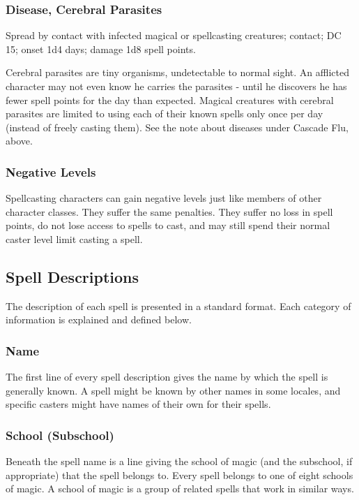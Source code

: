 \documentclass[../VancianToPsionics.tex]{subfiles}
\begin{document}
\subsubsection{Disease, Cerebral Parasites}
Spread by contact with infected magical or spellcasting creatures; contact; DC 15; onset 1d4 days; damage 1d8 spell points. 

Cerebral parasites are tiny organisms, undetectable to normal sight. An afflicted character may not even know he carries the parasites - until he discovers he has fewer spell points for the day than expected. Magical creatures with cerebral parasites are limited to using each of their known spells only once per day (instead of freely casting them). See the note about diseases under Cascade Flu, above.

\subsubsection{Negative Levels}
\label{sec:NegativeLevels}
Spellcasting characters can gain negative levels just like members of other character classes. They suffer the same penalties. They suffer no loss in spell points, do not lose access to spells to cast, and may still spend their normal caster level limit casting a spell.

\subsection{Spell Descriptions}
The description of each spell is presented in a standard format. Each category of information is explained and defined below.
\subsubsection{Name}
The first line of every spell description gives the name by which the spell is generally known. 
A spell might be known by other names in some locales, and specific casters might have names of their own for their spells.

\subsubsection{School (Subschool)}
\label{sec:MagicalSchools}
Beneath the spell name is a line giving the school of magic (and the subschool, if appropriate) that the spell belongs to.
Every spell belongs to one of eight schools of magic. A school of magic is a group of related spells that work in similar ways.
\end{document}
